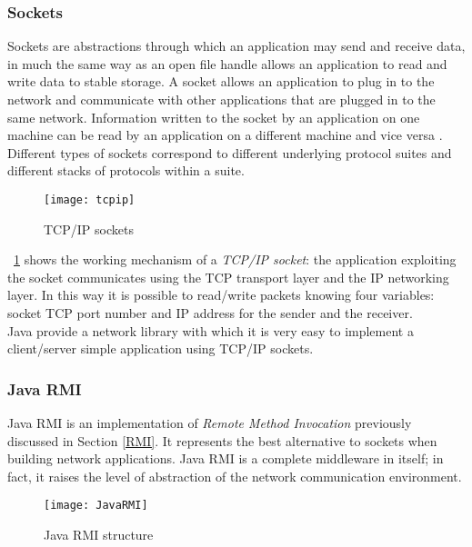 \subsubsection{Sockets} \label{socket} Sockets are abstractions through which an application may send and receive data, in much the same way as an open file handle allows an application to read and write data to stable storage.
A socket allows an application to plug in to the network and communicate with other applications that are plugged in to the same network. Information written to the socket by
an application on one machine can be read by an application on a different machine and vice versa \cite{calvert2011tcp}.
Different types of sockets correspond to different underlying protocol suites and different
stacks of protocols within a suite.
\begin{figure}[h]
	\centering
	\texttt{[image: tcpip]}
	\caption{TCP/IP sockets}
	\label{fig:2.15}
\end{figure}
\figurename~\ref{fig:2.15} shows the working mechanism of a \textit{TCP/IP socket}: the application exploiting the socket communicates using the TCP transport layer and the IP networking layer. In this way it is possible to read/write packets knowing four variables: socket TCP port number and IP address for the sender and the receiver.\\
Java provide a network library with which it is very easy to implement a client/server simple application using TCP/IP sockets. 
%
%

\subsubsection{Java RMI} Java RMI is an implementation of \textit{Remote Method Invocation} previously discussed in Section \ref{RMI}. It represents the best alternative to sockets when building network applications. Java RMI is a complete middleware in itself; in fact, it raises the level of abstraction of the network communication environment.
\begin{figure}[h]
	\centering
	\texttt{[image: JavaRMI]}
	\caption{Java RMI structure}
	\label{fig:2.16}
\end{figure}

